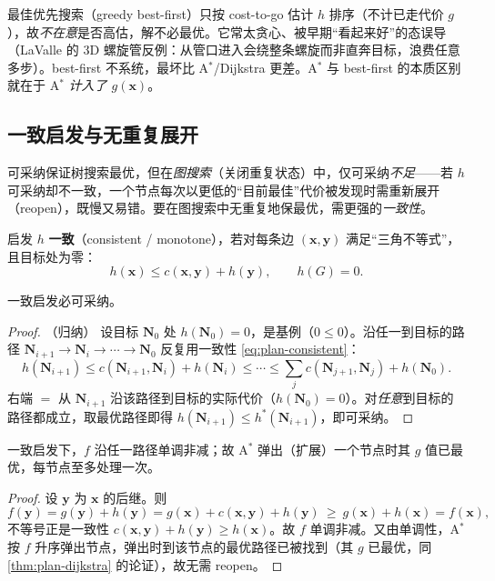 \begin{pitfall}
最佳优先搜索（greedy best-first）只按 cost-to-go 估计 $h$ 排序（不计已走代价 $g$），故\emph{不在意}是否高估，解不必最优。它常太贪心、被早期“看起来好”的态误导（LaValle\cite{lavalle2006planning} 的 3D 螺旋管反例：从管口进入会绕整条螺旋而非直奔目标，浪费任意多步）。best-first 不系统，最坏比 A$^*$/Dijkstra 更差。A$^*$ 与 best-first 的本质区别就在于 A$^*$ \emph{计入了 $g(\mathbf{x})$}。
\end{pitfall}

\subsection{一致启发与无重复展开}
\label{sec:plan-consistent}

可采纳保证树搜索最优，但在\emph{图搜索}（关闭重复状态）中，仅可采纳\emph{不足}——若 $h$ 可采纳却不一致，一个节点每次以更低的“目前最佳”代价被发现时需重新展开（reopen），既慢又易错。要在图搜索中无重复地保最优，需更强的\emph{一致性}。

\begin{definition}[一致（单调）启发]\label{def:plan-consistent}
启发 $h$ \textbf{一致}（consistent / monotone），若对每条边 $(\mathbf{x},\mathbf{y})$ 满足“三角不等式”，且目标处为零：
\begin{equation}
  h(\mathbf{x})\le c(\mathbf{x},\mathbf{y})+h(\mathbf{y}),\qquad h(G)=0.
  \label{eq:plan-consistent}
\end{equation}
\end{definition}

\begin{theorem}[一致蕴含可采纳]\label{thm:plan-cons-adm}
一致启发必可采纳。
\end{theorem}
\begin{proof}（归纳）
设目标 $\mathbf{N}_0$ 处 $h(\mathbf{N}_0)=0$，是基例（$0\le0$）。沿任一到目标的路径 $\mathbf{N}_{i+1}\to\mathbf{N}_i\to\cdots\to\mathbf{N}_0$ 反复用一致性 \cref{eq:plan-consistent}：
\[
  h(\mathbf{N}_{i+1})\le c(\mathbf{N}_{i+1},\mathbf{N}_i)+h(\mathbf{N}_i)\le\cdots\le\sum_{j} c(\mathbf{N}_{j+1},\mathbf{N}_j)+h(\mathbf{N}_0).
\]
右端 $=$ 从 $\mathbf{N}_{i+1}$ 沿该路径到目标的实际代价（$h(\mathbf{N}_0)=0$）。对\emph{任意}到目标的路径都成立，取最优路径即得 $h(\mathbf{N}_{i+1})\le h^*(\mathbf{N}_{i+1})$，即可采纳。
\end{proof}

\begin{theorem}\label{thm:plan-cons-mono}
一致启发下，$f$ 沿任一路径单调非减；故 A$^*$ 弹出（扩展）一个节点时其 $g$ 值已最优，每节点至多处理一次。
\end{theorem}
\begin{proof}
设 $\mathbf{y}$ 为 $\mathbf{x}$ 的后继。则
\[
  f(\mathbf{y})=g(\mathbf{y})+h(\mathbf{y})=g(\mathbf{x})+c(\mathbf{x},\mathbf{y})+h(\mathbf{y})\ \ge\ g(\mathbf{x})+h(\mathbf{x})=f(\mathbf{x}),
\]
不等号正是一致性 $c(\mathbf{x},\mathbf{y})+h(\mathbf{y})\ge h(\mathbf{x})$。故 $f$ 单调非减。又由单调性，A$^*$ 按 $f$ 升序弹出节点，弹出时到该节点的最优路径已被找到（其 $g$ 已最优，同 \cref{thm:plan-dijkstra} 的论证），故无需 reopen。
\end{proof}

